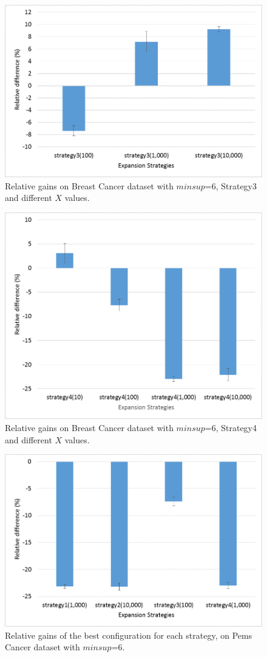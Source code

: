 \begin{figure}[!t]
\includegraphics[width=5in]{immagini_extension/breast_strategy3.png}
\caption{Relative gains on Breast Cancer dataset with $minsup$=6, Strategy3 and different $X$ values.
}
\label{breast_strategy3}
\end{figure}

\begin{figure}[!t]
\includegraphics[width=5in]{immagini_extension/breast_strategy4.png}
\caption{Relative gains on Breast Cancer dataset with $minsup$=6, Strategy4 and different $X$ values.
}
\label{breast_strategy4}
\end{figure}

\begin{figure}[!t]
\includegraphics[width=5in]{immagini_extension/breast_strategy_best.png}
\caption{Relative gains of the best configuration for each strategy, on Pems Cancer dataset with $minsup$=6.
}
\label{breast_strategy_best}
\end{figure}

